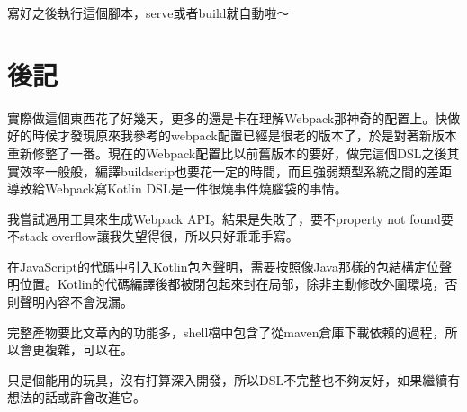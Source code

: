 寫好之後執行這個腳本，serve或者build就自動啦～






\section*{後記}

實際做這個東西花了好幾天，更多的還是卡在理解Webpack那神奇的配置上。快做好的時候才發現原來我參考的webpack配置已經是很老的版本了，於是對著新版本重新修整了一番。現在的Webpack配置比以前舊版本的要好，做完這個DSL之後其實效率一般般，編譯buildscrip也要花一定的時間，而且強弱類型系統之間的差距導致給Webpack寫Kotlin DSL是一件很燒事件燒腦袋的事情。

我嘗試過用工具來生成Webpack API。結果是失敗了，要不property not found要不stack overflow讓我失望得很，所以只好乖乖手寫。

在JavaScript的代碼中引入Kotlin包內聲明，需要按照像Java那樣的包結構定位聲明位置。Kotlin的代碼編譯後都被閉包起來封在局部，除非主動修改外圍環境，否則聲明內容不會洩漏。

完整產物要比文章內的功能多，shell檔中包含了從maven倉庫下載依賴的過程，所以會更複雜，可以在。

只是個能用的玩具，沒有打算深入開發，所以DSL不完整也不夠友好，如果繼續有想法的話或許會改進它。










